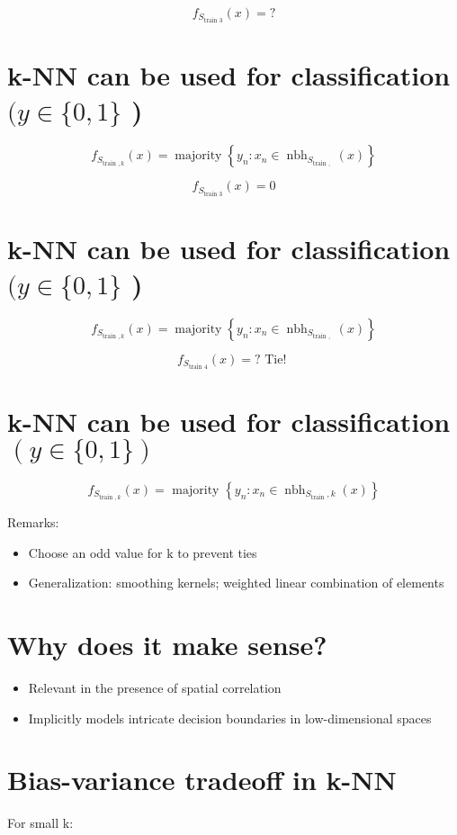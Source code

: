 $$
f_{S_{\text {train } 3}}(x)=?
$$

\section*{k-NN can be used for classification $(y \in\{0,1\}$ )}
$$
f_{S_{\text {train }, k}}(x)=\operatorname{majority}\left\{y_{n}: x_{n} \in \operatorname{nbh}_{S_{\text {train }, ~}}(x)\right\}
$$


$$
f_{S_{\text {train } 3}}(x)=0
$$

\section*{k-NN can be used for classification $(y \in\{0,1\}$ )}
$$
f_{S_{\text {train }, k}}(x)=\operatorname{majority}\left\{y_{n}: x_{n} \in \operatorname{nbh}_{S_{\text {train }, ~}}(x)\right\}
$$


$$
f_{S_{\text {train } 4}}(x)=? \text { Tie! }
$$

\section*{k-NN can be used for classification $(y \in\{0,1\})$}
$$
f_{S_{\text {train }, k}}(x)=\text { majority }\left\{y_{n}: x_{n} \in \operatorname{nbh}_{S_{\text {train }}, k}(x)\right\}
$$


Remarks:

\begin{itemize}
  \item Choose an odd value for $\mathrm{k}$ to prevent ties
  \item Generalization: smoothing kernels; weighted linear combination of elements
\end{itemize}

\section*{Why does it make sense?}
\begin{itemize}
  \item Relevant in the presence of spatial correlation

  \item Implicitly models intricate decision boundaries in low-dimensional spaces

\end{itemize}


\section*{Bias-variance tradeoff in k-NN}
For small k:

